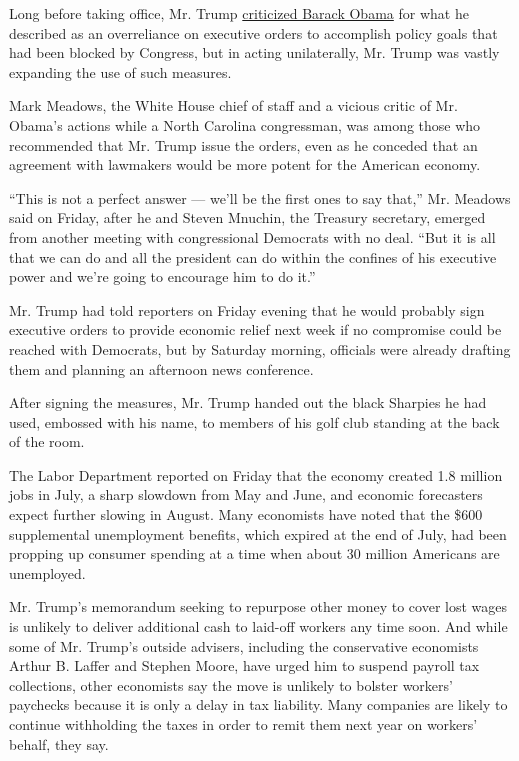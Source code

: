 Long before taking office, Mr. Trump
\href{https://twitter.com/realdonaldtrump/status/222739756105207808}{criticized
Barack Obama} for what he described as an overreliance on executive
orders to accomplish policy goals that had been blocked by Congress, but
in acting unilaterally, Mr. Trump was vastly expanding the use of such
measures.

Mark Meadows, the White House chief of staff and a vicious critic of Mr.
Obama's actions while a North Carolina congressman, was among those who
recommended that Mr. Trump issue the orders, even as he conceded that an
agreement with lawmakers would be more potent for the American economy.

``This is not a perfect answer --- we'll be the first ones to say
that,'' Mr. Meadows said on Friday, after he and Steven Mnuchin, the
Treasury secretary, emerged from another meeting with congressional
Democrats with no deal. ``But it is all that we can do and all the
president can do within the confines of his executive power and we're
going to encourage him to do it.''

Mr. Trump had told reporters on Friday evening that he would probably
sign executive orders to provide economic relief next week if no
compromise could be reached with Democrats, but by Saturday morning,
officials were already drafting them and planning an afternoon news
conference.

After signing the measures, Mr. Trump handed out the black Sharpies he
had used, embossed with his name, to members of his golf club standing
at the back of the room.

The Labor Department reported on Friday that the economy created 1.8
million jobs in July, a sharp slowdown from May and June, and economic
forecasters expect further slowing in August. Many economists have noted
that the \$600 supplemental unemployment benefits, which expired at the
end of July, had been propping up consumer spending at a time when about
30 million Americans are unemployed.

Mr. Trump's memorandum seeking to repurpose other money to cover lost
wages is unlikely to deliver additional cash to laid-off workers any
time soon. And while some of Mr. Trump's outside advisers, including the
conservative economists Arthur B. Laffer and Stephen Moore, have urged
him to suspend payroll tax collections, other economists say the move is
unlikely to bolster workers' paychecks because it is only a delay in tax
liability. Many companies are likely to continue withholding the taxes
in order to remit them next year on workers' behalf, they say.

